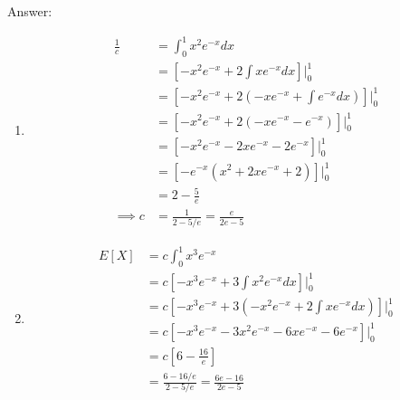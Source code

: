 \documentclass{article}
\begin{document}
\begin{enumerate}
Answer: 

\begin{enumerate}
\item 

\begin{align*}
\frac{1}{c} &= \int_0^1 x^2 e^{-x} dx \\
&= \left[-x^2e^{-x} + 2\int xe^{-x} dx \right] \biggr\vert_0^1 \\
&= \left[-x^2e^{-x} + 2\left(-xe^{-x} + \int e^{-x} dx\right) \right] \biggr\vert_0^1 \\
&= \left[-x^2e^{-x} + 2\left(-xe^{-x} -  e^{-x}\right) \right] \biggr\vert_0^1 \\
&= \left[-x^2e^{-x} - 2xe^{-x} -  2e^{-x} \right] \biggr\vert_0^1 \\
&= \left[-e^{-x}(x^2 + 2xe^{-x} + 2) \right] \biggr\vert_0^1 \\
&= 2-\frac{5}{e} \\
\implies c &= \boxed{\frac{1}{2 - 5/e} = \frac{e}{2e - 5}}
\end{align*}

\item

\begin{align*}
E[X] &= c\int_0^1 x^3e^{-x} \\
&= c\left[-x^3e^{-x} + 3\int x^2e^{-x} dx \right] \biggr\vert_0^1 \\
&= c\left[-x^3e^{-x} + 3\left( -x^2 e^{-x} + 2\int xe^{-x} dx\right) \right] \biggr\vert_0^1 \\
&= c\left[-x^3e^{-x} -3x^2 e^{-x} - 6 xe^{-x} - 6e^{-x}\right]\biggr\vert_0^1 \\
&= c\left[6 - \frac{16}{e}\right] \\
&= \boxed{\frac{6-16/e}{2-5/e} = \frac{6e - 16}{2e - 5}}
\end{align*}
\end{enumerate}


\end{enumerate}
\end{document}
